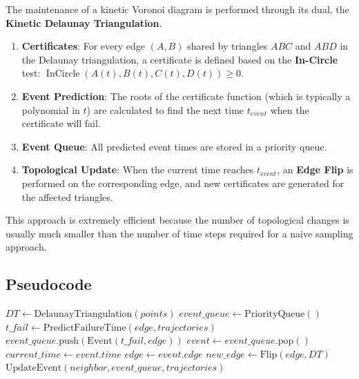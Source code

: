 The maintenance of a kinetic Voronoi diagram is performed through its dual, the \textbf{Kinetic Delaunay Triangulation}.
\begin{enumerate}
\item \textbf{Certificates}: For every edge $(A, B)$ shared by triangles $ABC$ and $ABD$ in the Delaunay triangulation, a certificate is defined based on the \textbf{In-Circle} test: $\operatorname{InCircle}(A(t), B(t), C(t), D(t)) \ge 0$.
\item \textbf{Event Prediction}: The roots of the certificate function (which is typically a polynomial in $t$) are calculated to find the next time $t_{event}$ when the certificate will fail.
\item \textbf{Event Queue}: All predicted event times are stored in a priority queue.
\item \textbf{Topological Update}: When the current time reaches $t_{event}$, an \textbf{Edge Flip} is performed on the corresponding edge, and new certificates are generated for the affected triangles.
\end{enumerate}

This approach is extremely efficient because the number of topological changes is usually much smaller than the number of time steps required for a naive sampling approach.

\subsection{Pseudocode}

\begin{algorithm}[htbp]
\caption{Kinetic Voronoi Maintenance}
\label{alg:kinetic_voronoi}
\begin{algorithmic}[1]
  \State $DT \gets \text{DelaunayTriangulation}(points)$
  \State $event\_queue \gets \text{PriorityQueue}()$
    \State $t\_fail \gets \text{PredictFailureTime}(edge, trajectories)$
      \State $event\_queue.\text{push}(\text{Event}(t\_fail, edge))$
    \EndIf
  \EndFor
    \State $event \gets event\_queue.\text{pop}()$
    \State $current\_time \gets event.time$
    \State $edge \gets event.edge$
    \State $new\_edge \gets \text{Flip}(edge, DT)$
      \State $\text{UpdateEvent}(neighbor, event\_queue, trajectories)$
    \EndFor
  \EndWhile
\EndFunction
\end{algorithmic}
\end{algorithm}

